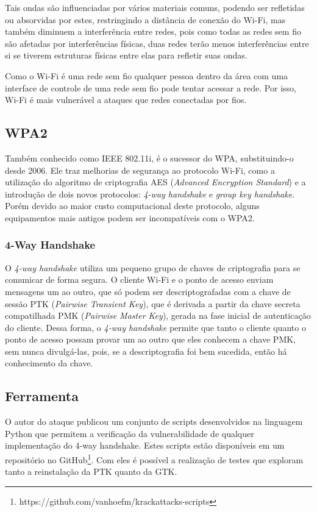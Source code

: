 \documentclass[12pt]{article}
\begin{document}
Tais ondas são influenciadas por vários materiais comuns, podendo ser refletidas ou absorvidas por estes, restringindo a distância de conexão do Wi-Fi, mas também diminuem a interferência entre redes, pois como todas as redes sem fio são afetadas por interferências físicas, duas redes terão menos interferências entre si se tiverem estruturas físicas entre elas para refletir suas ondas.

Como o Wi-Fi é uma rede sem fio qualquer pessoa dentro da área com uma interface de controle de uma rede sem fio pode tentar acessar a rede. Por isso, Wi-Fi é mais vulnerável a ataques que redes conectadas por fios.

\subsection{WPA2}
	Também conhecido como IEEE 802.11i, é o sucessor do WPA, substituindo-o desde 2006.
Ele traz melhorias de segurança ao protocolo Wi-Fi, como a utilização do algoritmo de criptografia AES (\textit{Advanced Encryption Standard}) e a introdução de dois novos protocolos: \textit{4-way handshake} e \textit{group key handshake}. Porém devido ao maior custo computacional deste protocolo, alguns equipamentos mais antigos podem ser incompatíveis com o WPA2.

\subsubsection{4-Way Handshake}
O \textit{4-way handshake} utiliza um pequeno grupo de chaves de criptografia para se comunicar de forma segura.
O cliente Wi-Fi e o ponto de acesso enviam mensagens um ao outro, que só podem ser descriptografadas com a chave de sessão PTK (\textit{Pairwise Transient Key}), que é derivada a partir da chave secreta compatilhada PMK (\textit{Pairwise Master Key}), gerada na fase inicial de autenticação do cliente.
	Dessa forma, o \textit{4-way handshake} permite que tanto o cliente quanto o ponto de acesso possam provar um ao outro que eles conhecem a chave PMK, sem nunca divulgá-las, pois, se a descriptografia foi bem sucedida, então há conhecimento da chave.
	
\subsection{Ferramenta}
O autor do ataque publicou um conjunto de scripts desenvolvidos na linguagem Python que permitem a verificação da vulnerabilidade de qualquer implementação do 4-way handshake. Estes scripts estão disponíveis em um repositório no GitHub\footnote{https://github.com/vanhoefm/krackattacks-scripts}. Com eles é possível a realização de testes que exploram tanto a reinstalação da PTK quanto da GTK.
\end{document}
